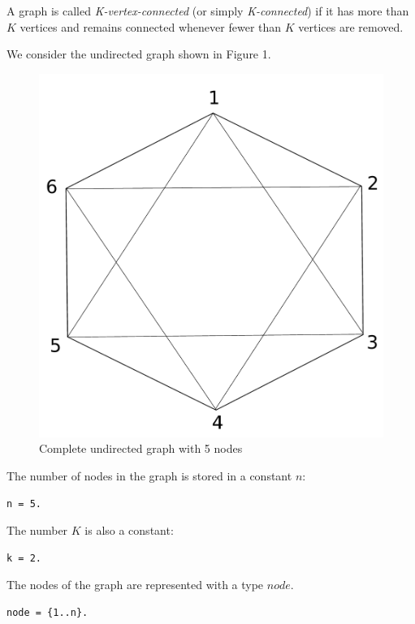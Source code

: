 \documentclass[a4paper,10pt]{article}
\begin{document}
A graph is called \textit{K-vertex-connected} (or simply \textit{K-connected})  if it has more than $K$ vertices and remains connected whenever fewer than $K$ vertices are removed.

\medskip\noindent
We consider the undirected graph shown in Figure 1.


\begin{figure}[h!]
\centering
\includegraphics[scale=0.3]{drawing}
\caption{Complete undirected graph with 5 nodes}
\end{figure}\label{fig1}


\noindent


\medskip\noindent
The number of nodes in the graph is stored in a constant $n$:
\begin{verbatim}
n = 5.
\end{verbatim}

\medskip\noindent
The number $K$ is also a constant:
\begin{verbatim}
k = 2.
\end{verbatim} 

\medskip\noindent
The nodes of the graph are represented with a type $node$.

\begin{verbatim}
node = {1..n}.
\end{verbatim}
\end{document}
